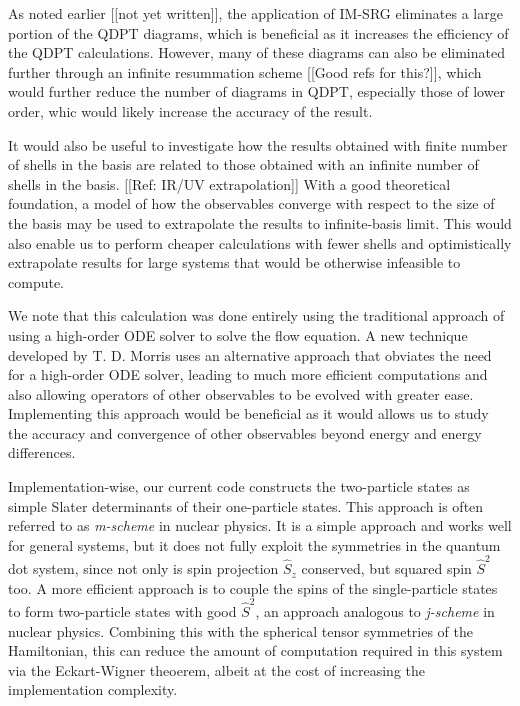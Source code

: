As noted earlier [[not yet written]], the application of IM-SRG eliminates a large portion of the QDPT diagrams, which is beneficial as it increases the efficiency of the QDPT calculations.  However, many of these diagrams can also be eliminated further through an infinite resummation scheme [[Good refs for this?]], which would further reduce the number of diagrams in QDPT, especially those of lower order, whic would likely increase the accuracy of the result.

It would also be useful to investigate how the results obtained with finite
number of shells in the basis are related to those obtained with an infinite
number of shells in the basis.  [[Ref: IR/UV extrapolation]] With a
good theoretical foundation, a model of how the observables converge with
respect to the size of the basis may be used to extrapolate the results to
infinite-basis limit.  This would also enable us to perform cheaper
calculations with fewer shells and optimistically extrapolate results for
large systems that would be otherwise infeasible to compute.

We note that this calculation was done entirely using the traditional approach of using a high-order ODE solver to solve the flow equation.  A new technique developed by T. D. Morris \cite{PhysRevC.92.034331} uses an alternative approach that obviates the need for a high-order ODE solver, leading to much more efficient computations and also allowing operators of other observables to be evolved with greater ease.  Implementing this approach would be beneficial as it would allows us to study the accuracy and convergence of other observables beyond energy and energy differences.

Implementation-wise, our current code constructs the two-particle states as simple Slater determinants of their one-particle states.  This approach is often referred to as \textit{m-scheme} in nuclear physics.  It is a simple approach and works well for general systems, but it does not fully exploit the symmetries in the quantum dot system, since not only is spin projection $\hat S_z$ conserved, but squared spin $\hat S^2$ too.  A more efficient approach is to couple the spins of the single-particle states to form two-particle states with good $\hat S^2$, an approach analogous to \textit{j-scheme} in nuclear physics.  Combining this with the spherical tensor symmetries of the Hamiltonian, this can reduce the amount of computation required in this system via the Eckart-Wigner theoerem, albeit at the cost of increasing the implementation complexity.

